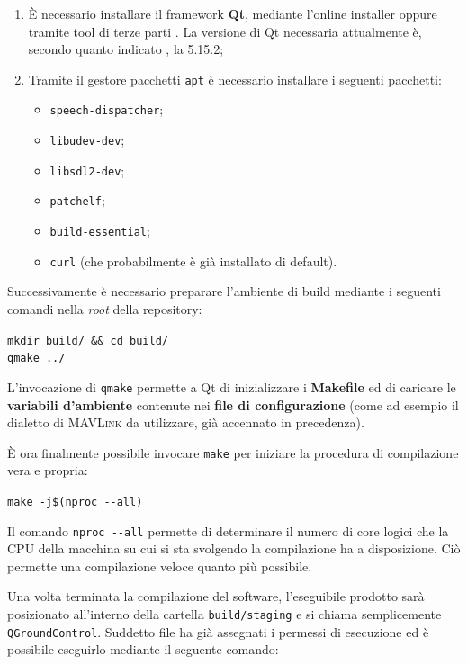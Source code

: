 \documentclass[a4paper, 12pt, oneside]{article}
\theoremstyle{definition}
\begin{document}
\begin{enumerate}
    \item È necessario installare il framework \textbf{Qt}, mediante l'online installer oppure tramite tool di terze parti \cite{aqtinstall}. La versione di Qt necessaria attualmente è, secondo quanto indicato \cite{build-qgc}, la 5.15.2;
    \item Tramite il gestore pacchetti \texttt{apt} è necessario installare i seguenti pacchetti:
        \begin{itemize}
            \item \texttt{speech-dispatcher};
            \item \texttt{libudev-dev};
            \item \texttt{libsdl2-dev};
            \item \texttt{patchelf};
            \item \texttt{build-essential};
            \item \texttt{curl} (che probabilmente è già installato di default).
        \end{itemize}
\end{enumerate}

Successivamente è necessario preparare l'ambiente di build mediante i seguenti comandi nella \textit{root} della repository:

\begin{center}
    \texttt{mkdir build/ \&\& cd build/} \\
    \texttt{qmake ../}
\end{center}

L'invocazione di \texttt{qmake} permette a Qt di inizializzare i \textbf{Makefile} ed di caricare le \textbf{variabili d'ambiente} contenute nei \textbf{file di configurazione} (come ad esempio il dialetto di \textsc{MAVLink} da utilizzare, già accennato in precedenza).

È ora finalmente possibile invocare \texttt{make} per iniziare la procedura di compilazione vera e propria:

\begin{center}
    \texttt{make -j\$(nproc -{}-all)}
\end{center}

Il comando \texttt{nproc -{}-all} permette di determinare il numero di core logici che la CPU della macchina su cui si sta svolgendo la compilazione ha a disposizione. Ciò permette una compilazione veloce quanto più possibile.

Una volta terminata la compilazione del software, l'eseguibile prodotto sarà posizionato all'interno della cartella \texttt{build/staging} e si chiama semplicemente \texttt{QGroundControl}. Suddetto file ha già assegnati i permessi di esecuzione ed è possibile eseguirlo mediante il seguente comando:
\end{document}
